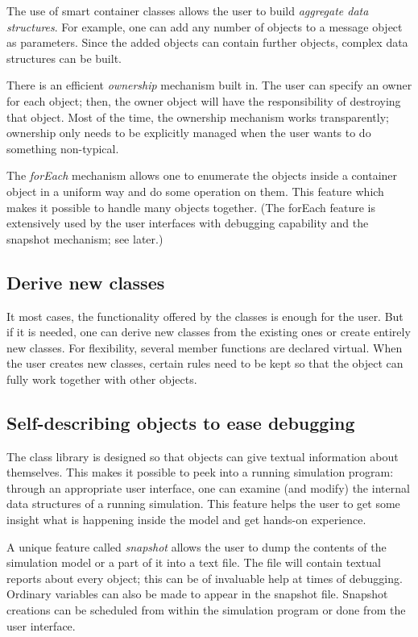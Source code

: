 The use of smart container classes allows the user to build
\textit{aggregate data structures}.
For example, one can add any number of objects to a message object as
parameters. Since the added objects can contain further objects,
complex data structures can be built.

There is an efficient \textit{ownership} mechanism
built in. The user can specify an owner for each object; then, the
owner object will have the responsibility of destroying that object.
Most of the time, the ownership mechanism works transparently;
ownership only needs to be explicitly managed when the user wants to
do something non-typical.


The \textit{forEach} mechanism allows one to
enumerate the objects inside a container object in a uniform way and
do some operation on them. This feature which makes it possible to
handle many objects together. (The forEach feature is extensively used
by the user interfaces with debugging capability and the snapshot
mechanism; see later.)


\subsection{Derive new classes}

It most cases, the functionality offered by the {\opp} classes 
is enough for the user. But if it is needed, one can derive new 
classes from the existing ones or create entirely new classes. 
For flexibility, several member functions are declared virtual. 
When the user creates new classes, certain rules need to be kept 
so that the object can fully work together with other objects.


\subsection{Self-describing objects to ease debugging}

The class library is designed so that objects can give textual 
information about themselves. This makes it possible to peek 
into a running simulation program: through an appropriate user 
interface, one can examine (and modify) the internal data structures 
of a running simulation. This feature helps the user to get some 
insight what is happening inside the model and get hands-on experience.


A unique feature called \textit{snapshot} allows the
user to dump the contents of the simulation model or a part of it into
a text file. The file will contain textual reports about every object;
this can be of invaluable help at times of debugging. Ordinary
variables can also be made to appear in the snapshot file. Snapshot
creations can be scheduled from within the simulation program or done
from the user interface.



